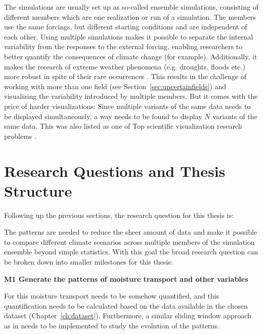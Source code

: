The simulations are usually set up as so-called ensemble simulations, consisting of different members which are one realization or run of a simulation. 
The members use the same forcings, but different starting conditions and are independent of each other. 
Using multiple simulations makes it possible to separate the internal variability from the responses to the external forcing, enabling researchers to better quantify the consequences of climate change (for example). 
Additionally, it makes the research of extreme weather phenomena (e.g. droughts, floods etc.) more robust in spite of their rare occurrences \cite{maher_large_2021}.
This results in the challenge of working with more than one field (see Section~\ref{sec:uncertainfields}) and visualizing the variability introduced by multiple members. 
But it comes with the price of harder visualizations: Since multiple variants of the same data needs to be displayed simultaneously, a way needs to be found to display $N$ variants of the same data. 
This was also listed as one of Top scientific visualization research problems \cite{johnson_top_2004}. 


\section{Research Questions and Thesis Structure}
\label{sec:research_questions}

Following up the previous sections, the research question for this thesis is: 

\begin{center}
\end{center}

The patterns are needed to reduce the sheer amount of data and make it possible to compare different climate scenarios across multiple members of the simulation ensemble beyond simple statistics.
With this goal the broad research question can be broken down into smaller milestones for this thesis: 

\textbf{M1 Generate the patterns of moisture transport and other variables}

For this moisture transport needs to be somehow quantified, and this quantification needs to be calculated based on the data available in the chosen dataset (Chapter~\ref{ch:dataset}). 
Furthermore, a similar sliding window approach as in \cite{vietinghoff_visual_2021} needs to be implemented to study the evolution of the patterns.


